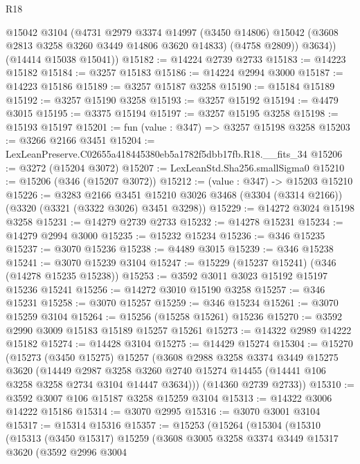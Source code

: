 \begin{lexlean}{R18}
\begin{coremodule}
          @15042
          @3104
          (@4731
            @2979
            @3374
            @14997
            (@3450 @14806)
            @15042
            (@3608 @2813 @3258 @3260 @3449 @14806 @3620 @14833)
            (@4758 @2809))
          @3634))
      (@14414 @15038 @15041))
@15182 := @14224 @2739 @2733
@15183 := @14223 @15182
@15184 := @3257 @15183
@15186 := @14224 @2994 @3000
@15187 := @14223 @15186
@15189 := @3257 @15187 @3258
@15190 := @15184 @15189
@15192 := @3257 @15190 @3258
@15193 := @3257 @15192
@15194 := @4479 @3015
@15195 := @3375 @15194
@15197 := @3257 @15195 @3258
@15198 := @15193 @15197
@15201 := fun (value : @347) => @3257 @15198 @3258
@15203 := @3266 @2166 @3451
@15204 := LexLeanPreserve.C02655a418445380eb5a1782f5dbb17fb.R18.__fits_34
@15206 := @3272 (@15204 @3072)
@15207 := LexLeanStd.Sha256.smallSigma0
@15210 := @15206 (@346 (@15207 @3072))
@15212 := (value : @347) -> @15203 @15210
@15226 := @3283
    @2166
    @3451
    @15210
    @3026
    @3468
    (@3304 (@3314 @2166))
    (@3320 (@3321 (@3322 @3026) @3451 @3298))
@15229 := @14272 @3024 @15198 @3258
@15231 := @14279 @2739 @2733
@15232 := @14278 @15231
@15234 := @14279 @2994 @3000
@15235 := @15232 @15234
@15236 := @346 @15235
@15237 := @3070 @15236
@15238 := @4489 @3015
@15239 := @346 @15238
@15241 := @3070 @15239 @3104
@15247 := @15229 (@15237 @15241) (@346 (@14278 @15235 @15238))
@15253 := @3592 @3011 @3023 @15192 @15197 @15236 @15241
@15256 := @14272 @3010 @15190 @3258
@15257 := @346 @15231
@15258 := @3070 @15257
@15259 := @346 @15234
@15261 := @3070 @15259 @3104
@15264 := @15256 (@15258 @15261) @15236
@15270 := @3592 @2990 @3009 @15183 @15189 @15257 @15261
@15273 := @14322 @2989 @14222 @15182
@15274 := @14428 @3104
@15275 := @14429 @15274
@15304 := @15270
    (@15273
      (@3450 @15275)
      @15257
      (@3608
        @2988
        @3258
        @3374
        @3449
        @15275
        @3620
        (@14449
          @2987
          @3258
          @3260
          @2740
          @15274
          @14455
          (@14441 @106 @3258 @3258 @2734 @3104 @14447 @3634)))
      (@14360 @2739 @2733))
@15310 := @3592 @3007 @106 @15187 @3258 @15259 @3104
@15313 := @14322 @3006 @14222 @15186
@15314 := @3070 @2995
@15316 := @3070 @3001 @3104
@15317 := @15314 @15316
@15357 := @15253
    (@15264
      (@15304
        (@15310
          (@15313
            (@3450 @15317)
            @15259
            (@3608
              @3005
              @3258
              @3374
              @3449
              @15317
              @3620
              (@3592
                @2996
                @3004

\end{coremodule}
\end{lexlean}
